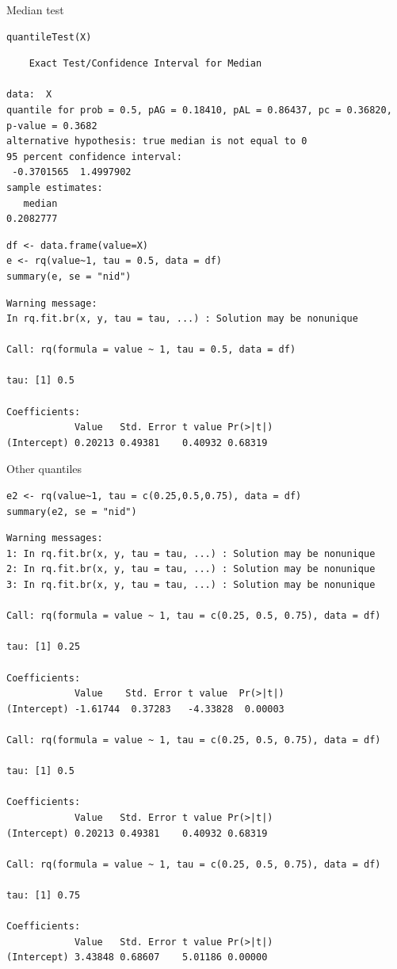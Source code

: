 \documentclass{article}
\begin{document}
Median test
\lstset{language=r,label= ,caption= ,captionpos=b,numbers=none}
\begin{lstlisting}
quantileTest(X)
\end{lstlisting}

\begin{verbatim}
	Exact Test/Confidence Interval for Median

data:  X
quantile for prob = 0.5, pAG = 0.18410, pAL = 0.86437, pc = 0.36820, p-value = 0.3682
alternative hypothesis: true median is not equal to 0
95 percent confidence interval:
 -0.3701565  1.4997902
sample estimates:
   median 
0.2082777
\end{verbatim}

\lstset{language=r,label= ,caption= ,captionpos=b,numbers=none}
\begin{lstlisting}
df <- data.frame(value=X)
e <- rq(value~1, tau = 0.5, data = df)
summary(e, se = "nid")
\end{lstlisting}

\begin{verbatim}
Warning message:
In rq.fit.br(x, y, tau = tau, ...) : Solution may be nonunique

Call: rq(formula = value ~ 1, tau = 0.5, data = df)

tau: [1] 0.5

Coefficients:
            Value   Std. Error t value Pr(>|t|)
(Intercept) 0.20213 0.49381    0.40932 0.68319
\end{verbatim}

Other quantiles
\lstset{language=r,label= ,caption= ,captionpos=b,numbers=none}
\begin{lstlisting}
e2 <- rq(value~1, tau = c(0.25,0.5,0.75), data = df)
summary(e2, se = "nid")
\end{lstlisting}

\begin{verbatim}
Warning messages:
1: In rq.fit.br(x, y, tau = tau, ...) : Solution may be nonunique
2: In rq.fit.br(x, y, tau = tau, ...) : Solution may be nonunique
3: In rq.fit.br(x, y, tau = tau, ...) : Solution may be nonunique

Call: rq(formula = value ~ 1, tau = c(0.25, 0.5, 0.75), data = df)

tau: [1] 0.25

Coefficients:
            Value    Std. Error t value  Pr(>|t|)
(Intercept) -1.61744  0.37283   -4.33828  0.00003

Call: rq(formula = value ~ 1, tau = c(0.25, 0.5, 0.75), data = df)

tau: [1] 0.5

Coefficients:
            Value   Std. Error t value Pr(>|t|)
(Intercept) 0.20213 0.49381    0.40932 0.68319 

Call: rq(formula = value ~ 1, tau = c(0.25, 0.5, 0.75), data = df)

tau: [1] 0.75

Coefficients:
            Value   Std. Error t value Pr(>|t|)
(Intercept) 3.43848 0.68607    5.01186 0.00000
\end{verbatim}
\end{document}
